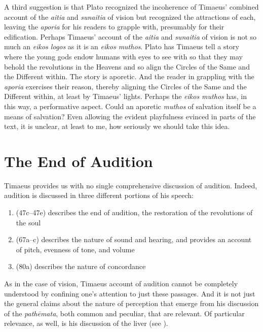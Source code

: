 A third suggestion is that Plato recognized the incoherence of Timaeus' combined account of the \emph{aitia} and \emph{sunaitia} of vision but recognized the attractions of each, leaving the \emph{aporia} for his readers to grapple with, presumably for their edification. Perhaps Timaeus' account of the \emph{aitia} and \emph{sunaitia} of vision is not so much an \emph{eikos logos} as it is an \emph{eikos muthos}. Plato has Timaeus tell a story where the young gods endow humans with eyes to see with so that they may behold the revolutions in the Heavens and so align the Circles of the Same and the Different within. The story is aporetic. And the reader in grappling with the \emph{aporia} exercises their reason, thereby aligning the Circles of the Same and the Different within, at least by Timaeus' lights. Perhaps the \emph{eikos muthos} has, in this way, a performative aspect. Could an aporetic \emph{muthos} of salvation itself be a means of salvation? Even allowing the evident playfulness evinced in parts of the text, it is unclear, at least to me, how seriously we should take this idea.



\section{The End of Audition} %
\label{sec:the_end_of_audition}

Timaeus provides us with no single comprehensive discussion of audition. Indeed, audition is discussed in three different portions of his speech:
\begin{enumerate}[(1)]
	\item (47c–47e) describes the end of audition, the restoration of the revolutions of the soul
	\item (67a–c) describes the nature of sound and hearing, and provides an account of pitch, evenness of tone, and volume
	\item (80a) describes the nature of concordance
\end{enumerate}
As in the case of vision, Timaeus account of audition cannot be completely understood by confining one's attention to just these passages. And it is not just the general claims about the nature of perception that emerge from his discussion of the \emph{pathēmata}, both common and peculiar, that are relevant. Of particular relevance, as well, is his discussion of the liver (see \citealt{Barker:2000dy}).

